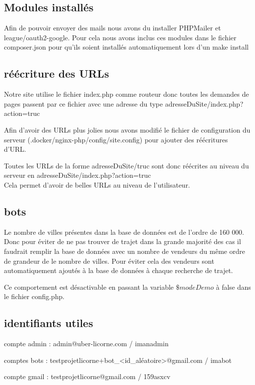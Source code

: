 \documentclass{article}
\begin{document}
    \subsection{Modules installés}
        Afin de pouvoir envoyer des mails nous avons du installer PHPMailer et league/oauth2-google. Pour cela nous avons inclus ces modules dans le fichier composer.json pour qu'ils soient installés automatiquement lors d'un make install
        
    \subsection{réécriture des URLs}
        Notre site utilise le fichier index.php comme routeur donc toutes les demandes de pages passent par ce fichier avec une adresse du type adresseDuSite/index.php?action=truc
        
        Afin d'avoir des URLs plus jolies nous avons modifié le fichier de configuration du serveur (.docker/nginx-php/config/site.config) pour ajouter des réécritures d'URL.
        
        Toutes les URLs de la forme adresseDuSite/truc sont donc réécrites au niveau du serveur en adresseDuSite/index.php?action=truc
        \\
        
        Cela permet d'avoir de belles URLs au niveau de l'utilisateur.
        
    \subsection{bots}
        Le nombre de villes présentes dans la base de données est de l'ordre de 160 000. Donc pour éviter de ne pas trouver de trajet dans la grande majorité des cas il faudrait remplir la base de données avec un nombre de vendeurs du même ordre de grandeur de le nombre de villes. Pour éviter cela des vendeurs sont automatiquement ajoutés à la base de données à chaque recherche de trajet.
        
        Ce comportement est désactivable en passant la variable $\$modeDemo$ à false dans le fichier config.php.
        
    \subsection{identifiants utiles}
        compte admin : admin@uber-licorne.com / imanadmin
        
        comptes bots : testprojetlicorne+bot\_<id\_aléatoire>@gmail.com / imabot
        
        compte gmail : testprojetlicorne@gmail.com / 159asxcv
        
\end{document}

